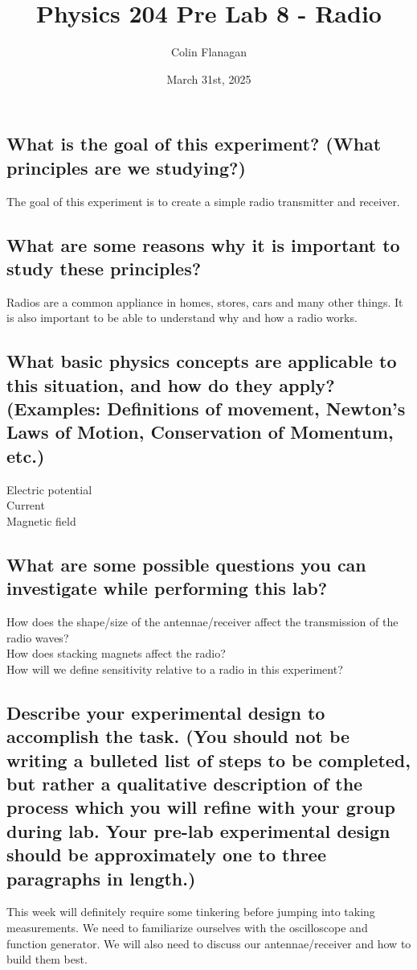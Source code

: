 \documentclass{article}
\title{Physics 204 Pre Lab 8 - Radio}
\author{Colin Flanagan}
\date{March 31st, 2025}
\begin{document}
\maketitle

\subsection*{What is the goal of this experiment? (What principles are we studying?)}

    The goal of this experiment is to create a simple radio transmitter and receiver. 

\subsection*{What are some reasons why it is important to study these principles?
}

  Radios are a common appliance in homes, stores, cars and many other things. It is also important to be able to understand why and how a radio works.
    
\subsection*{What basic physics concepts are applicable to this situation, and how do they apply? (Examples: Definitions of movement, Newton’s Laws of Motion, Conservation of Momentum, etc.)}

    Electric potential\\

    Current\\

    Magnetic field\\

\subsection*{What are some possible questions you can investigate while performing this lab?
}

   How does the shape/size of the antennae/receiver affect the transmission of the radio waves?\\

   How does stacking magnets affect the radio?\\

   How will we define sensitivity relative to a radio in this experiment?\\

\subsection*{Describe your experimental design to accomplish the task. (You should not be writing a bulleted list of steps to be completed, but rather a qualitative description of the process which you will refine with your group during lab. Your pre-lab experimental design should be approximately one to three paragraphs in length.)}

    This week will definitely require some tinkering before jumping into taking measurements. We need to familiarize ourselves with the oscilloscope and function generator. We will also need to discuss our antennae/receiver and how to build them best. 
\end{document}
